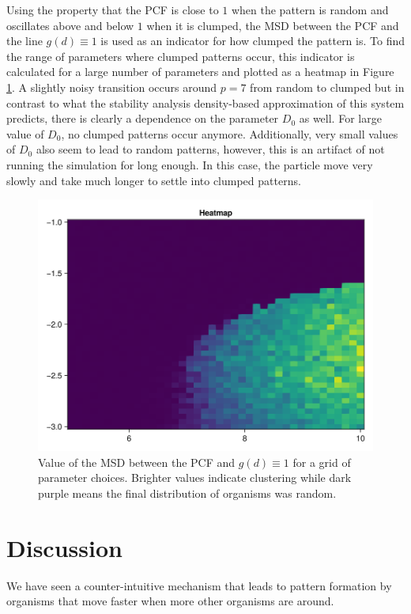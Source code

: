 \documentclass{article}
\begin{document}
Using the property that the PCF is close to $1$ when the pattern is random and oscillates above and below $1$ when it is clumped, the MSD between the PCF and the line $g(d)\equiv 1$ is used as an indicator for how clumped the pattern is.
To find the range of parameters where clumped patterns occur, this indicator is calculated for a large number of parameters and plotted as a heatmap in Figure \ref{heatmap1000}. 
A slightly noisy transition occurs around $p=7$ from random to clumped but in contrast to what the stability analysis density-based approximation of this system predicts, there is clearly a dependence on the parameter $D_0$ as well. 
For large value of $D_0$, no clumped patterns occur anymore.
Additionally, very small values of $D_0$ also seem to lead to random patterns, however, this is an artifact of not running the simulation for long enough. 
In this case, the particle move very slowly and take much longer to settle into clumped patterns.
\begin{figure}
    \label{heatmap1000}
    \includegraphics[width=0.9\linewidth]{img/heatmap1000.png}
    \caption{Value of the MSD between the PCF and $g(d) \equiv 1$ for a grid of parameter choices. Brighter values indicate clustering while dark purple means the final distribution of organisms was random.} 
\end{figure}

\section{Discussion}
We have seen a counter-intuitive mechanism that leads to pattern formation by organisms that move faster when more other organisms are around. 
\end{document}

